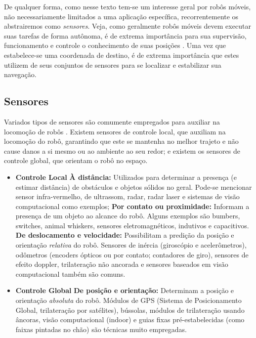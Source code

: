 De qualquer forma, como nesse texto tem-se um interesse geral por robôs móveis, não necessariamente limitados a uma aplicação específica, recorrentemente os abstrairemos como \textit{sensores}. Veja, como geralmente robôs móveis devem executar suas tarefas de forma autônoma, é de extrema importância para sua supervisão, funcionamento e controle o conhecimento de suas posições \cite{mobileRobotsCook}. Uma vez que estabelece-se uma coordenada de destino, é de extrema importância que estes utilizem de seus conjuntos de sensores para se localizar e estabilizar sua navegação.

\subsection{Sensores}
Variados tipos de sensores são comumente empregados para auxiliar na locomoção de robôs \cite{sensorsForMobileRobots}. Existem sensores de controle local, que auxiliam na locomoção do robô, garantindo que este se mantenha no melhor trajeto e não cause danos a si mesmo ou ao ambiente ao seu redor; e existem os sensores de controle global, que orientam o robô no espaço.
\begin{itemize}
	\item \textbf{Controle Local}
	\subitem \textbf{À distância:} Utilizados para determinar a presença (e estimar distância) de obstáculos e objetos sólidos no geral. Pode-se mencionar sensor infra-vermelho, de ultrassom, radar, radar laser e sistemas de visão computacional como exemplos; 
	\subitem \textbf{Por contato ou proximidade:} Informam a presença de um objeto ao alcance do robô. Alguns exemplos são bumbers, switches, animal whiskers, sensores eletromagnéticos, indutivos e capacitivos.
	\subitem \textbf{De deslocamento e velocidade:} Possibilitam a predição da posição e orientação \textit{relativa} do robô. Sensores de inércia (giroscópio e acelerômetros), odômetros (encoders ópticos ou por contato; contadores de giro), sensores de efeito doppler, trilateração não ancorada e sensores baseados em visão computacional também são comuns.
	\item \textbf{Controle Global}
	\subitem \textbf{De posição e orientação: } Determinam a posição e orientação \textit{absoluta} do robô. Módulos de GPS (Sistema de Posicionamento Global, trilateração por satélites), bússolas, módulos de trilateração usando âncoras, visão computacional (indoor) e guias fixas pré-estabelecidas (como faixas pintadas no chão) são técnicas muito empregadas.
\end{itemize}

